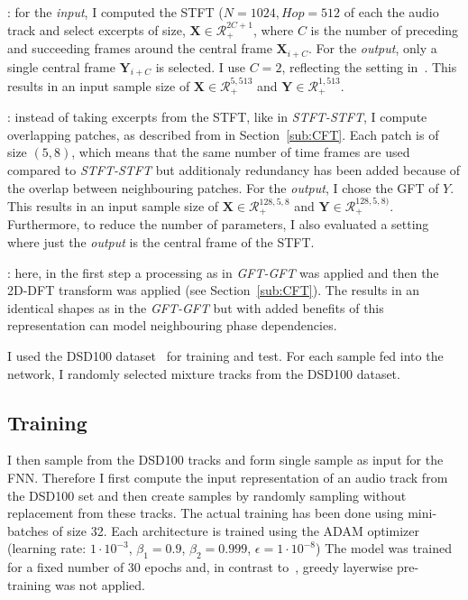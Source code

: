 \begin{description}[style=unboxed,leftmargin=0cm]
\item[STFT-STFT]: for the \emph{input}, I computed the STFT (\(N=1024, Hop=512\) of each the audio track and select excerpts of size, \(\mathbf{X} \in \mathcal{R}^{2C + 1}_{+} \), where \(C\) is the number of preceding and succeeding frames around the central frame \(\mathbf{X}_{i+C}\). For the \emph{output}, only a single central frame \(\mathbf{Y}_{i+C}\) is selected.
I use \(C=2\), reflecting the setting in~\cite{uhlich15}. This results in an input sample size of \(\mathbf{X} \in \mathcal{R}_{+}^{5, 513}\) and  \(\mathbf{Y} \in \mathcal{R}_{+}^{1, 513}\).

\item[GFT-GFT/GFT-STFT]: instead of taking excerpts from the STFT, like in \emph{STFT-STFT}, I compute overlapping patches, as described from in Section~\ref{sub:CFT}. Each patch is of size \((5, 8)\), which means that the same number of time frames are used compared to \emph{STFT-STFT} but additionaly redundancy has been added because of the overlap between neighbouring patches.
For the \emph{output}, I chose the GFT of \(Y\).
This results in an input sample size of \(\mathbf{X} \in \mathcal{R}_{+}^{128, 5, 8}\) and  \(\mathbf{Y} \in \mathcal{R}_{+}^{128, 5, 8)}\).
Furthermore, to reduce the number of parameters, I also evaluated a setting where just the \emph{output} is the central frame of the STFT.

\item[CFT-CFT/CFT-STFT]: here, in the first step a processing as in \emph{GFT-GFT} was applied and then the 2D-DFT transform was applied (see Section~\ref{sub:CFT}).
The results in an identical shapes as in the \emph{GFT-GFT} but with added benefits of this representation can model neighbouring phase dependencies.
\end{description}

I used the DSD100 dataset~\cite{ono15} for training and test. 
For each sample fed into the network, I randomly selected mixture tracks from the DSD100 dataset.

\subsection{Training}

I then sample from the DSD100 tracks and form single sample as input for the FNN.
Therefore I first compute the input representation of an audio track from the DSD100 set and then create samples by randomly sampling without replacement from these tracks.
The actual training has been done using mini-batches of size 32.
Each architecture is trained using the ADAM optimizer~\cite{kingma14} (learning rate: \(1 \cdot 10^{-3}\), \(\beta_1=0.9\), \(\beta_2=0.999\), \(\epsilon=1 \cdot 10^{-8}\))
The model was trained for a fixed number of 30 epochs and, in contrast to~\cite{uhlich15}, greedy layerwise pre-training was not applied.

